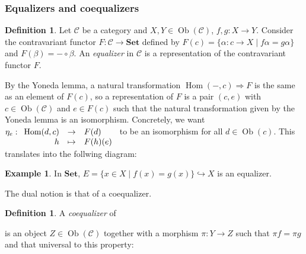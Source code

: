 \documentclass{article}
\newcommand{\cat}{\mathcal{C}}
\newcommand{\Set}{\mathbf{Set}}
\DeclareMathOperator{\Ob}{Ob}
\DeclareMathOperator{\Hom}{Hom}
\newcommand{\applic}[4]{\begin{array}[t]{rcl}
#1 & \to & #2 \\
#3 & \mapsto & #4
\end{array}}
\theoremstyle{plain}
\theoremstyle{definition}
\newtheorem{definition}[theorem]{Definition}
\newtheorem{example}[theorem]{Example}
\theoremstyle{remark}
\begin{document}
\subsubsection{Equalizers and coequalizers}

\begin{definition}
    Let $\cat$ be a category and $X,Y \in \Ob(\cat)$, $f,g : X \to Y$. Consider the contravariant functor $F : \cat \to \Set$ defined by $F(c) = \{\alpha : c \to X \mid f\alpha = g \alpha\}$ and $F(\beta) = - \circ \beta$. An \emph{equalizer} in $\cat$ is a representation of the contravariant functor $F$.
\end{definition}

By the Yoneda lemma, a natural transformation $\Hom(-,c) \Rightarrow F$ is the same as an element of $F(c)$, so a representation of $F$ is a pair $(c,e)$ with $c \in \Ob(\cat)$ and $e \in F(c)$ such that the natural transformation given by the Yoneda lemma is an isomorphism. Concretely, we want $\eta_e : \applic{\Hom(d,c)}{F(d)}{h}{F(h)(e)}$ to be an isomorphism for all $d \in \Ob(c)$. This translates into the follwing diagram:
\begin{center}
\end{center}

\begin{example}
    In $\Set$, $E = \{x \in X \mid f(x) = g(x)\} \hookrightarrow X$ is an equalizer.
\end{example}

The dual notion is that of a coequalizer.

\begin{definition}
    A \emph{coequalizer} of  is an object $Z \in \Ob(\cat)$ together with a morphism $\pi : Y\to Z$ such that $\pi f = \pi g$ and that universal to this property:
    \begin{center}
    \end{center}
\end{definition}
\end{document}
